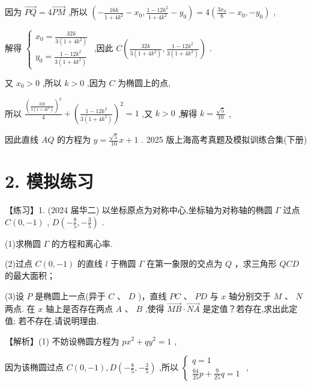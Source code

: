 \documentclass[10pt]{article}
\begin{document}
因为 \(\overrightarrow{PQ} = 4\overrightarrow{PM}\) ,所以 \(\left( {-\frac{16k}{1 + 4{k}^{2}} - {x}_{0},\frac{1 - {12}{k}^{2}}{1 + 4{k}^{2}} - {y}_{0}}\right)  = 4\left( {\frac{3{x}_{0}}{8} - {x}_{0}, - {y}_{0}}\right)\) ,

解得 \(\left\{  \begin{array}{l} {x}_{0} = \frac{32k}{3\left( {1 + 4{k}^{2}}\right) } \\  {y}_{0} = \frac{1 - {12}{k}^{2}}{3\left( {1 + 4{k}^{2}}\right) } \end{array}\right.\) ,因此 \(C\left( {\frac{32k}{3\left( {1 + 4{k}^{2}}\right) },\frac{1 - {12}{k}^{2}}{3\left( {1 + 4{k}^{2}}\right) }}\right)\) .

又 \({x}_{0} > 0\) ,所以 \(k > 0\) ,因为 \(C\) 为椭圆上的点,

所以 \(\frac{{\left( \frac{32k}{3\left( {1 + 4{k}^{2}}\right) }\right) }^{2}}{4} + {\left( \frac{1 - {12}{k}^{2}}{3\left( {1 + 4{k}^{2}}\right) }\right) }^{2} = 1\) ,又 \(k > 0\) ,解得 \(k = \frac{\sqrt{5}}{10}\) ,

因此直线 \({AQ}\) 的方程为 \(y = \frac{\sqrt{5}}{10}x + 1\) . 2025 版上海高考真题及模拟训练合集(下册)

\section*{2. 模拟练习}

【练习】1. (2024 届华二) 以坐标原点为对称中心,坐标轴为对称轴的椭圆 \(\Gamma\) 过点 \(C\left( {0, - 1}\right)\) , \(D\left( {-\frac{8}{5}, - \frac{3}{5}}\right)\) .

(1)求椭圆 \(\Gamma\) 的方程和离心率.

(2)过点 \(C\left( {0, - 1}\right)\) 的直线 \(l\) 于椭圆 \(\Gamma\) 在第一象限的交点为 \(Q\) ，求三角形 \({QCD}\) 的最大面积；

(3)设 \(P\) 是椭圆上一点(异于 \(C\) 、 \(D\) )，直线 \({PC}\) 、 \({PD}\) 与 \(x\) 轴分别交于 \(M\) 、 \(N\) 两点. 在 \(x\) 轴上是否存在两点 \(A\text{ 、 }B\) ,使得 \(\overrightarrow{MB} \cdot  \overrightarrow{NA}\) 是定值？若存在,求出此定值; 若不存在,请说明理由.

【解析】(1) 不妨设椭圆方程为 \(p{x}^{2} + q{y}^{2} = 1\) ,

因为该椭圆过点 \(C\left( {0, - 1}\right) ,D\left( {-\frac{8}{5}, - \frac{3}{5}}\right)\) ,所以 \(\left\{  \begin{array}{l} q = 1 \\  \frac{64}{25}p + \frac{9}{25}q = 1 \end{array}\right.\) ,
\end{document}
